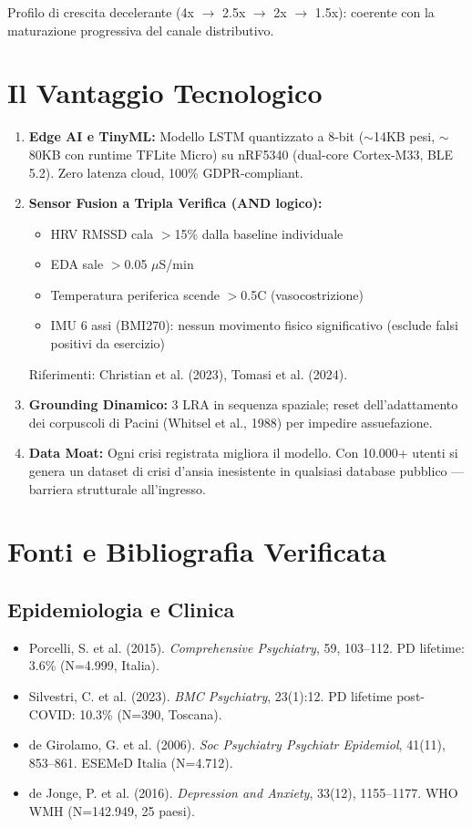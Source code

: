 \documentclass[12pt,a4paper]{article}
\begin{document}
Profilo di crescita decelerante (4x $\rightarrow$ 2.5x $\rightarrow$ 2x $\rightarrow$ 1.5x): coerente con la maturazione progressiva del canale distributivo.

\section{Il Vantaggio Tecnologico}

\begin{enumerate}
    \item \textbf{Edge AI e TinyML:} Modello LSTM quantizzato a 8-bit ($\sim$14KB pesi, $\sim$80KB con runtime TFLite Micro) su nRF5340 (dual-core Cortex-M33, BLE 5.2). Zero latenza cloud, 100\% GDPR-compliant.
    \item \textbf{Sensor Fusion a Tripla Verifica (AND logico):}
    \begin{itemize}
        \item HRV RMSSD cala $>$15\% dalla baseline individuale
        \item EDA sale $>$0.05 $\mu$S/min
        \item Temperatura periferica scende $>$0.5\textdegree C (vasocostrizione)
        \item IMU 6 assi (BMI270): nessun movimento fisico significativo (esclude falsi positivi da esercizio)
    \end{itemize}
    Riferimenti: Christian et al. (2023), Tomasi et al. (2024).
    \item \textbf{Grounding Dinamico:} 3 LRA in sequenza spaziale; reset dell'adattamento dei corpuscoli di Pacini (Whitsel et al., 1988) per impedire assuefazione.
    \item \textbf{Data Moat:} Ogni crisi registrata migliora il modello. Con 10.000+ utenti si genera un dataset di crisi d'ansia inesistente in qualsiasi database pubblico --- barriera strutturale all'ingresso.
\end{enumerate}

\section{Fonti e Bibliografia Verificata}

\subsection{Epidemiologia e Clinica}
\begin{itemize}
    \item Porcelli, S. et al. (2015). \textit{Comprehensive Psychiatry}, 59, 103--112. PD lifetime: 3.6\% (N=4.999, Italia).
    \item Silvestri, C. et al. (2023). \textit{BMC Psychiatry}, 23(1):12. PD lifetime post-COVID: 10.3\% (N=390, Toscana).
    \item de Girolamo, G. et al. (2006). \textit{Soc Psychiatry Psychiatr Epidemiol}, 41(11), 853--861. ESEMeD Italia (N=4.712).
    \item de Jonge, P. et al. (2016). \textit{Depression and Anxiety}, 33(12), 1155--1177. WHO WMH (N=142.949, 25 paesi).
\end{itemize}
\end{document}
